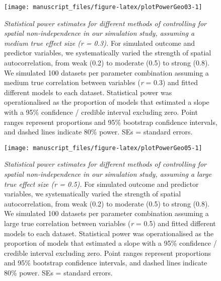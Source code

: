 \documentclass[
  man,floatsintext]{apa6}
\begin{document}
\newpage



\begin{figure}[H]
\texttt{[image: manuscript\_files/figure-latex/plotPowerGeo03-1]} \caption{\emph{Statistical power estimates for different methods of controlling for spatial non-independence in our simulation study, assuming a medium true effect size (r = 0.3).} For simulated outcome and predictor variables, we systematically varied the strength of spatial autocorrelation, from weak (0.2) to moderate (0.5) to strong (0.8). We simulated 100 datasets per parameter combination assuming a medium true correlation between variables (\emph{r} = 0.3) and fitted different models to each dataset. Statistical power was operationalised as the proportion of models that estimated a slope with a 95\% confidence / credible interval excluding zero. Point ranges represent proportions and 95\% bootstrap confidence intervals, and dashed lines indicate 80\% power. SEs = standard errors.}\label{fig:plotPowerGeo03}
\end{figure}

\newpage



\begin{figure}[H]
\texttt{[image: manuscript\_files/figure-latex/plotPowerGeo05-1]} \caption{\emph{Statistical power estimates for different methods of controlling for spatial non-independence in our simulation study, assuming a large true effect size (r = 0.5).} For simulated outcome and predictor variables, we systematically varied the strength of spatial autocorrelation, from weak (0.2) to moderate (0.5) to strong (0.8). We simulated 100 datasets per parameter combination assuming a large true correlation between variables (\emph{r} = 0.5) and fitted different models to each dataset. Statistical power was operationalised as the proportion of models that estimated a slope with a 95\% confidence / credible interval excluding zero. Point ranges represent proportions and 95\% bootstrap confidence intervals, and dashed lines indicate 80\% power. SEs = standard errors.}\label{fig:plotPowerGeo05}
\end{figure}

\newpage
\end{document}
